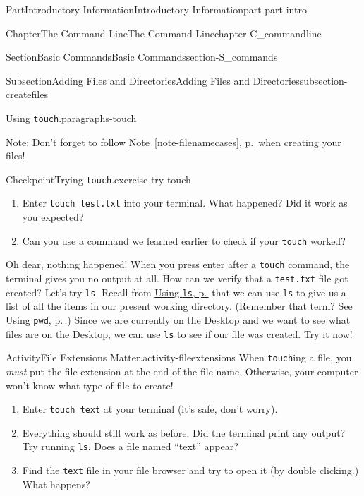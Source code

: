 \documentclass[twoside,10pt,]{book}
\newcommand{\xreffont}{\relax}
\newcommand{\mono}[1]{\texttt{#1}}
\begin{document}
\begin{partptx}{Part}{Introductory Information}{}{Introductory Information}{}{}{part-part-intro}
\begin{chapterptx}{Chapter}{The Command Line}{}{The Command Line}{}{}{chapter-C_commandline}
\begin{sectionptx}{Section}{Basic Commands}{}{Basic Commands}{}{}{section-S_commands}
\begin{subsectionptx}{Subsection}{Adding Files and Directories}{}{Adding Files and Directories}{}{}{subsection-createfiles}
\begin{paragraphs}{Using \mono{touch}.}{paragraphs-touch}
\par
Note: Don't forget to follow \hyperref[note-filenamecases]{Note~{\xreffont\ref{note-filenamecases}}, p.\,\pageref{note-filenamecases}} when creating your files!%
\begin{inlineexercise}{Checkpoint}{Trying \mono{touch}.}{exercise-try-touch}%
\begin{enumerate}[font=\bfseries,label=(\alph*),ref=\alph*]%
\item{}Enter \mono{touch test.txt} into your terminal. What happened? Did it work as you expected?%
\item{}Can you use a command we learned earlier to check if your \mono{touch} worked?%
\end{enumerate}%
\end{inlineexercise}%
Oh dear, nothing happened! When you press enter after a \mono{touch} command, the terminal gives you no output at all. How can we verify that a \mono{test.txt} file got created? Let's try \mono{ls}. Recall from \hyperlink{paragraphs-ls}{Using \mono{ls}, p.\,\pageref{paragraphs-ls}} that we can use \mono{ls} to give us a list of all the items in our present working directory. (Remember that term? See \hyperlink{paragraphs-pwd}{Using \mono{pwd}, p.\,\pageref{paragraphs-pwd}}.) Since we are currently on the Desktop and we want to see what files are on the Desktop, we can use \mono{ls} to see if our file was created. Try it now!%
\begin{activity}{Activity}{File Extensions Matter.}{activity-fileextensions}%
%
%
When \mono{touch}ing a file, you \emph{must} put the file extension at the end of the file name. Otherwise, your computer won't know what type of file to create!%
\begin{enumerate}[font=\bfseries,label=(\alph*),ref=\alph*]%
\item{}Enter \mono{touch text} at your terminal (it's safe, don't worry).%
\item{}Everything should still work as before. Did the terminal print any output? Try running \mono{ls}. Does a file named ``text'' appear?%
\item{}Find the \mono{text} file in your file browser and try to open it (by double clicking.) What happens?%
\end{enumerate}%

\end{activity}
\end{paragraphs}
\end{subsectionptx}
\end{sectionptx}
\end{chapterptx}
\end{partptx}
\end{document}

